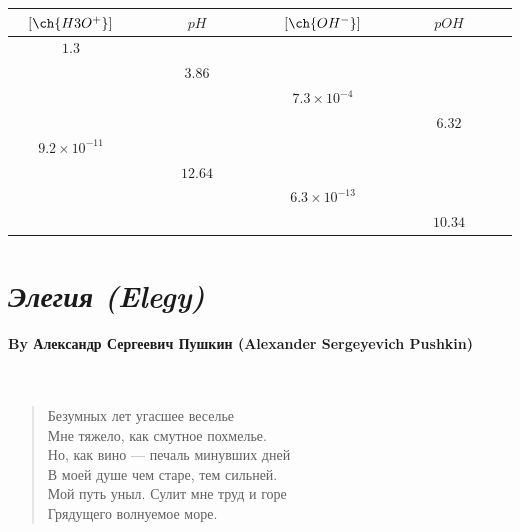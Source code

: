 \documentclass[11pt, letterpaper]{memoir}
\begin{document}
{	\begin{tabular}{|c|c|c|c|}
		\toprule
		$\left[\ch{H3O^+}\right]$ & $pH$ & $\left[\ch{OH^-}\right]$ & $pOH$ \\ \midrule \midrule
		$ 1.3 $ & $\hspace{8em}$ & $\hspace{8em}$ & $\hspace{8em}$ \\ \midrule
		$\hspace{8em}$ & $3.86$ & $\hspace{8em}$ & $\hspace{8em}$ \\ \midrule
		$\hspace{8em}$ & $\hspace{8em}$ & $ 7.3\times10^{-4}$ & $\hspace{8em}$ \\ \midrule
		$\hspace{8em}$ & $\hspace{8em}$ & $\hspace{8em}$ & $6.32$ \\ \midrule
		$ 9.2\times10^{-11}$ & $\hspace{8em}$ & $\hspace{8em}$ & $\hspace{8em}$ \\ \midrule
		$\hspace{8em}$ & $12.64$ & $\hspace{8em}$ & $\hspace{8em}$ \\ \midrule
		$\hspace{8em}$ & $\hspace{8em}$ & $ 6.3\times10^{-13}$ & $\hspace{8em}$ \\ \midrule
		$\hspace{8em}$ & $\hspace{8em}$ & $\hspace{8em}$ & $10.34$ \\
		\bottomrule
	\end{tabular}
	
	
	
	\newpage
	\pagestyle{empty}
	\addtocounter{page}{-1}
	\section*{\emph{Элегия (Elegy)}}
	\paragraph{By Александр Сергеевич Пушкин (Alexander Sergeyevich Pushkin)}~
	\begin{verse}
		Безумных лет угасшее веселье\\
		Мне тяжело, как смутное похмелье.\\
		Но, как вино — печаль минувших дней\\
		В моей душе чем старе, тем сильней.\\
		Мой путь уныл. Сулит мне труд и горе\\
		Грядущего волнуемое море.
		

\end{verse}}
\end{document}

